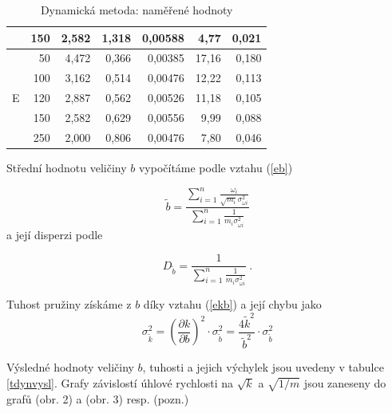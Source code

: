 \documentclass{article}
\begin{document}
\begin{table}[htbp]
\begin{center}
\begin{tabular}{|c||r|r|r|r|r|r|}
&  150 & 2,582 & 1,318 & 0,00588 & 4,77 & 0,021 \\ \hline
\multirow{5}{*}{\centering E}  & 50 & 4,472 & 0,366 & 0,00385 & 17,16 & 0,180 \\ 
&  100 & 3,162 & 0,514 & 0,00476 & 12,22 & 0,113 \\
&  120 & 2,887 & 0,562 & 0,00526 & 11,18 & 0,105 \\ 
&  150 & 2,582 & 0,629 & 0,00556 & 9,99 & 0,088 \\ \
&  250 & 2,000 & 0,806 & 0,00476 & 7,80 & 0,046 \\ \hline
\end{tabular}
\caption{Dynamická metoda: naměřené hodnoty}
\label{tdyndata}
\end{center}

\end{table}



Střední hodnotu veličiny $b$ vypočítáme podle vztahu (\ref{eb}) \cite{englich}

\begin{equation} \label{eb}
\tilde{b} = \frac    {\sum_{i=1}^{n}  \frac{\omega _{i}}{  \sqrt{m_{i}} \sigma _{\omega i}^{2   }  }  }      {\sum_{i=1}^{n}  \frac   {1}         {m_{i} \sigma _{\omega i}^{2}     }}
\end{equation}
a její disperzi podle \cite{englich}

\begin{equation*}
D_{\tilde{b}} = \frac{1}{\sum_{i=1}^{n}  \frac{1}  {m_{i} \sigma _{\omega i} ^{2}    }                     }~.
\end{equation*} 

Tuhost pružiny získáme z $b$ díky vztahu (\ref{ekb}) a její chybu jako
\begin{equation*}
\sigma _{\tilde{k}}^{2}=   (\frac{\partial k}   {\partial b})^{2} \cdot \sigma _{\tilde{b}}^{2} = \frac{4 \tilde{k} ^{2}}{\tilde{b}^{2}} \cdot \sigma _{\tilde{b}}^{2}
\end{equation*}

Výsledné hodnoty veličiny $b$, tuhosti a jejich výchylek jsou uvedeny v tabulce \ref{tdynvysl}. Grafy závislostí úhlové rychlosti na $\sqrt{k}$ a $\sqrt{1/m}$ jsou zaneseny do grafů (obr. 2) a (obr. 3) resp. (pozn.)
\end{document}
